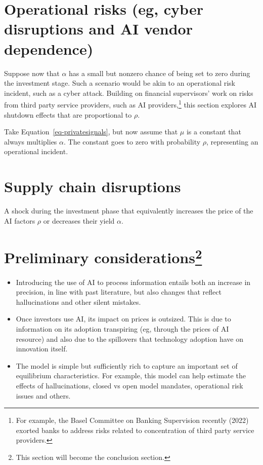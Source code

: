 \documentclass[
]{article}
\theoremstyle{plain}
\theoremstyle{remark}
\begin{document}
\hypertarget{operational-risks-eg-cyber-disruptions-and-ai-vendor-dependence}{%
\section{Operational risks (eg, cyber disruptions and AI vendor
dependence)}\label{operational-risks-eg-cyber-disruptions-and-ai-vendor-dependence}}

Suppose now that \(\alpha\) has a small but nonzero chance of being set
to zero during the investment stage. Such a scenario would be akin to an
operational risk incident, such as a cyber attack. Building on financial
supervisors' work on risks from third party service providers, such as
AI providers,\footnote{For example, the Basel Committee on Banking
  Supervision recently (2022) exorted banks to address risks related to
  concentration of third party service providers.} this section explores
AI shutdown effects that are proportional to \(\rho\).

Take Equation~\ref{eq-privatesignals}, but now assume that \(\mu\) is a
constant that always multiplies \(\alpha\). The constant goes to zero
with probability \(\rho\), representing an operational incident.

\hypertarget{supply-chain-disruptions}{%
\section{Supply chain disruptions}\label{supply-chain-disruptions}}

A shock during the investment phase that equivalently increases the
price of the AI factors \(\rho\) or decreases their yield \(\alpha\).

\hypertarget{preliminary-considerationsconcl}{%
\section[Preliminary considerations]{\texorpdfstring{Preliminary
considerations\footnote{This section will become the conclusion section.}}{Preliminary considerations}}\label{preliminary-considerationsconcl}}

\begin{itemize}
\item
  Introducing the use of AI to process information entails both an
  increase in precision, in line with past literature, but also changes
  that reflect hallucinations and other silent mistakes.
\item
  Once investors use AI, its impact on prices is outsized. This is due
  to information on its adoption transpiring (eg, through the prices of
  AI resource) and also due to the spillovers that technology adoption
  have on innovation itself.
\item
  The model is simple but sufficiently rich to capture an important set
  of equilibrium characteristics. For example, this model can help
  estimate the effects of hallucinations, closed vs open model mandates,
  operational risk issues and others.
\end{itemize}
\end{document}

